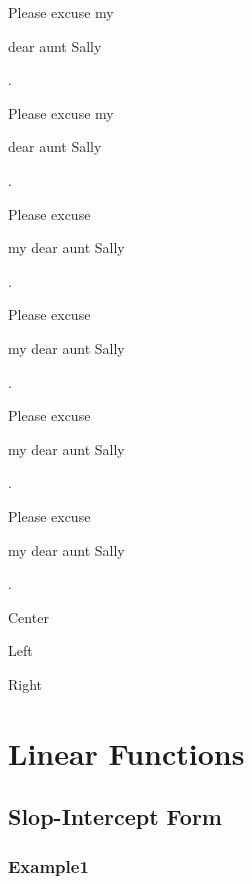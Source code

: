 \documentclass[11pt, a4paper]{article}
\begin{document}
Please excuse my \begin{huge}dear aunt Sally\end{huge}. 

Please excuse my \begin{Huge}dear aunt Sally\end{Huge}. 

\begin{Huge}Please excuse \begin{normalsize}my dear aunt Sally\end{normalsize}\end{Huge}. 

\begin{Huge}Please excuse \begin{small}my dear aunt Sally\end{small}\end{Huge}. 

\begin{Huge}Please excuse \begin{scriptsize}my dear aunt Sally\end{scriptsize}\end{Huge}. 

\begin{Huge}Please excuse \begin{tiny}my dear aunt Sally\end{tiny}\end{Huge}. 

\begin{center}
Center
\end{center}

\begin{flushleft}
Left
\end{flushleft}

\begin{flushright}
Right
\end{flushright}

\pagebreak

\section{Linear Functions}
    \subsection{Slop-Intercept Form}
        \subsubsection{Example1}
\end{document}
